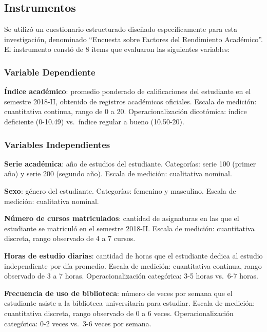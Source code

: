 \documentclass[
  stu,
  floatsintext,
  longtable,
  a4paper,
  nolmodern,
  notxfonts,
  notimes,
  12pt,
  colorlinks=true,linkcolor=blue,citecolor=blue,urlcolor=blue]{apa7}
\begin{document}
\subsection{Instrumentos}\label{instrumentos}

Se utilizó un cuestionario estructurado diseñado específicamente para
esta investigación, denominado ``Encuesta sobre Factores del Rendimiento
Académico''. El instrumento constó de 8 ítems que evaluaron las
siguientes variables:

\subsubsection{Variable Dependiente}\label{variable-dependiente}

\textbf{Índice académico}: promedio ponderado de calificaciones del
estudiante en el semestre 2018-II, obtenido de registros académicos
oficiales. Escala de medición: cuantitativa continua, rango de 0 a 20.
Operacionalización dicotómica: índice deficiente (0-10.49) vs.~índice
regular a bueno (10.50-20).

\subsubsection{Variables Independientes}\label{variables-independientes}

\textbf{Serie académica}: año de estudios del estudiante. Categorías:
serie 100 (primer año) y serie 200 (segundo año). Escala de medición:
cualitativa nominal.

\textbf{Sexo}: género del estudiante. Categorías: femenino y masculino.
Escala de medición: cualitativa nominal.

\textbf{Número de cursos matriculados}: cantidad de asignaturas en las
que el estudiante se matriculó en el semestre 2018-II. Escala de
medición: cuantitativa discreta, rango observado de 4 a 7 cursos.

\textbf{Horas de estudio diarias}: cantidad de horas que el estudiante
dedica al estudio independiente por día promedio. Escala de medición:
cuantitativa continua, rango observado de 3 a 7 horas.
Operacionalización categórica: 3-5 horas vs.~6-7 horas.

\textbf{Frecuencia de uso de biblioteca}: número de veces por semana que
el estudiante asiste a la biblioteca universitaria para estudiar. Escala
de medición: cuantitativa discreta, rango observado de 0 a 6 veces.
Operacionalización categórica: 0-2 veces vs.~3-6 veces por semana.
\end{document}
